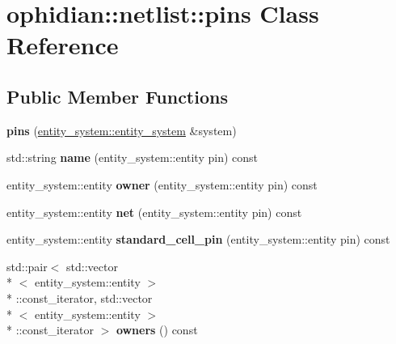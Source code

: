 \hypertarget{classophidian_1_1netlist_1_1pins}{\section{ophidian\-:\-:netlist\-:\-:pins Class Reference}
\label{classophidian_1_1netlist_1_1pins}
}
\subsection*{Public Member Functions}
\begin{DoxyCompactItemize}
\item 
\hypertarget{classophidian_1_1netlist_1_1pins_afcda6263f341c274193838dee2a5fc9d}{{\bfseries pins} (\hyperlink{classophidian_1_1entity__system_1_1entity__system}{entity\-\_\-system\-::entity\-\_\-system} \&system)}\label{classophidian_1_1netlist_1_1pins_afcda6263f341c274193838dee2a5fc9d}

\item 
\hypertarget{classophidian_1_1netlist_1_1pins_ab52a1cb05d4788475938d301fef949f4}{std\-::string {\bfseries name} (entity\-\_\-system\-::entity pin) const }\label{classophidian_1_1netlist_1_1pins_ab52a1cb05d4788475938d301fef949f4}

\item 
\hypertarget{classophidian_1_1netlist_1_1pins_a139efda0481e4e32abf23696148b825e}{entity\-\_\-system\-::entity {\bfseries owner} (entity\-\_\-system\-::entity pin) const }\label{classophidian_1_1netlist_1_1pins_a139efda0481e4e32abf23696148b825e}

\item 
\hypertarget{classophidian_1_1netlist_1_1pins_ab05031658152d3c21089e888d83672d1}{entity\-\_\-system\-::entity {\bfseries net} (entity\-\_\-system\-::entity pin) const }\label{classophidian_1_1netlist_1_1pins_ab05031658152d3c21089e888d83672d1}

\item 
\hypertarget{classophidian_1_1netlist_1_1pins_acc3f1a04ea93e72257a1d44bc49af909}{entity\-\_\-system\-::entity {\bfseries standard\-\_\-cell\-\_\-pin} (entity\-\_\-system\-::entity pin) const }\label{classophidian_1_1netlist_1_1pins_acc3f1a04ea93e72257a1d44bc49af909}

\item 
\hypertarget{classophidian_1_1netlist_1_1pins_a3e5da47f56dee605a7a24e9aaf58c3a2}{std\-::pair$<$ std\-::vector\\*
$<$ entity\-\_\-system\-::entity $>$\\*
\-::const\-\_\-iterator, std\-::vector\\*
$<$ entity\-\_\-system\-::entity $>$\\*
\-::const\-\_\-iterator $>$ {\bfseries owners} () const }\label{classophidian_1_1netlist_1_1pins_a3e5da47f56dee605a7a24e9aaf58c3a2}


\end{DoxyCompactItemize}
